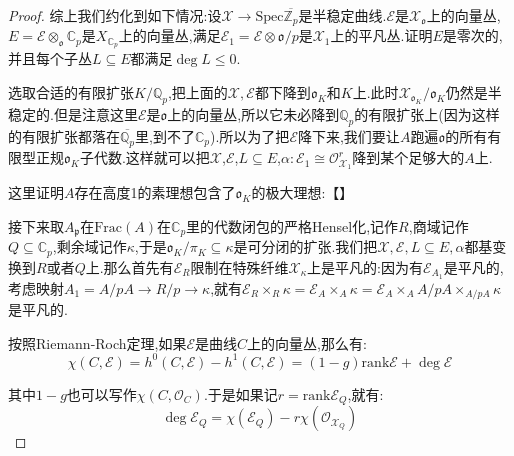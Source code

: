 \begin{enumerate}
\begin{proof}
    	\qquad
    	
    	综上我们约化到如下情况:设$\mathcal{X}\to\mathrm{Spec}\overline{\mathbb{Z}_p}$是半稳定曲线.$\mathcal{E}$是$\mathcal{X}_{\mathfrak{o}}$上的向量丛,$E=\mathcal{E}\otimes_{\mathfrak{o}}\mathbb{C}_p$是$X_{\mathbb{C}_p}$上的向量丛,满足$\mathcal{E}_1=\mathcal{E}\otimes\mathfrak{o}/p$是$\mathcal{X}_1$上的平凡丛.证明$E$是零次的,并且每个子丛$L\subseteq E$都满足$\deg L\le0$.
    	
    	\qquad
    	
    	选取合适的有限扩张$K/\mathbb{Q}_p$,把上面的$\mathcal{X},\mathcal{E}$都下降到$\mathfrak{o}_K$和$K$上.此时$\mathcal{X}_{\mathfrak{o}_K}/\mathfrak{o}_K$仍然是半稳定的.但是注意这里$\mathcal{E}$是$\mathfrak{o}$上的向量丛,所以它未必降到$\mathbb{Q}_p$的有限扩张上(因为这样的有限扩张都落在$\overline{\mathbb{Q}_p}$里,到不了$\mathbb{C}_p$).所以为了把$\mathcal{E}$降下来,我们要让$A$跑遍$\mathfrak{o}$的所有有限型正规$\mathfrak{o}_K$子代数.这样就可以把$\mathcal{X}$,$\mathcal{E}$,$L\subseteq E$,$\alpha:\mathcal{E}_1\cong\mathscr{O}_{\mathcal{X}_1}^r$降到某个足够大的$A$上.
    	
    	\qquad
    	
    	这里证明$A$存在高度1的素理想包含了$\mathfrak{o}_K$的极大理想:【】
    	
    	\qquad
    	
    	接下来取$A_{\mathfrak{p}}$在$\mathrm{Frac}(A)$在$\mathbb{C}_p$里的代数闭包的严格Hensel化,记作$R$,商域记作$Q\subseteq\mathbb{C}_p$,剩余域记作$\kappa$,于是$\mathfrak{o}_K/\pi_K\subseteq\kappa$是可分闭的扩张.我们把$\mathcal{X},\mathcal{E},L\subseteq E,\alpha$都基变换到$R$或者$Q$上.那么首先有$\mathcal{E}_R$限制在特殊纤维$\mathcal{X}_{\kappa}$上是平凡的:因为有$\mathcal{E}_{A_1}$是平凡的,考虑映射$A_1=A/pA\to R/p\to\kappa$,就有$\mathcal{E}_R\times_R\kappa=\mathcal{E}_A\times_A\kappa=\mathcal{E}_A\times_AA/pA\times_{A/pA}\kappa$是平凡的.
    	
    	\qquad
    	
    	按照Riemann-Roch定理,如果$\mathcal{E}$是曲线$C$上的向量丛,那么有:
    	$$\chi(C,\mathcal{E})=h^0(C,\mathcal{E})-h^1(C,\mathcal{E})=(1-g)\mathrm{rank}\mathcal{E}+\deg\mathcal{E}$$
    	
    	其中$1-g$也可以写作$\chi(C,\mathscr{O}_C)$.于是如果记$r=\mathrm{rank}\mathcal{E}_Q$,就有:
    	$$\deg\mathcal{E}_Q=\chi(\mathcal{E}_Q)-r\chi(\mathscr{O}_{\mathcal{X}_Q})$$
    	

\end{proof}
\end{enumerate}
